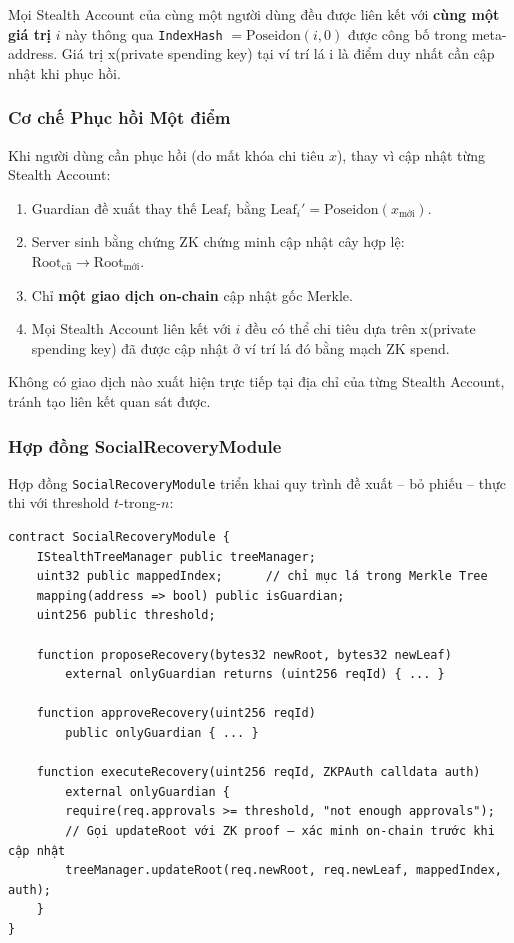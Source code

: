 \documentclass[../DoAn.tex]{subfiles}
\begin{document}
Mọi Stealth Account của cùng một người dùng đều được liên kết với \textbf{cùng một giá trị} $i$ này thông qua \texttt{IndexHash} $= \text{Poseidon}(i, 0)$ được công bố trong meta-address. Giá trị x(private spending key) tại ví trí lá i là điểm duy nhất cần cập nhật khi phục hồi.

\subsubsection{Cơ chế Phục hồi Một điểm}

Khi người dùng cần phục hồi (do mất khóa chi tiêu $x$), thay vì cập nhật từng Stealth Account:

\begin{enumerate}
    \item Guardian đề xuất thay thế $\text{Leaf}_i$ bằng $\text{Leaf}_i' = \text{Poseidon}(x_{\text{mới}})$.
    \item Server sinh bằng chứng ZK chứng minh cập nhật cây hợp lệ: $\text{Root}_{\text{cũ}} \to \text{Root}_{\text{mới}}$.
    \item Chỉ \textbf{một giao dịch on-chain} cập nhật gốc Merkle.
    \item Mọi Stealth Account liên kết với $i$ đều có thể chi tiêu dựa trên x(private spending key) đã được cập nhật ở ví trí lá đó bằng mạch ZK spend.
\end{enumerate}

Không có giao dịch nào xuất hiện trực tiếp tại địa chỉ của từng Stealth Account, tránh tạo liên kết quan sát được.

\subsubsection{Hợp đồng SocialRecoveryModule}

Hợp đồng \texttt{SocialRecoveryModule} triển khai quy trình đề xuất -- bỏ phiếu -- thực thi với threshold $t$-trong-$n$:

\begin{verbatim}
contract SocialRecoveryModule {
    IStealthTreeManager public treeManager;
    uint32 public mappedIndex;      // chỉ mục lá trong Merkle Tree
    mapping(address => bool) public isGuardian;
    uint256 public threshold;

    function proposeRecovery(bytes32 newRoot, bytes32 newLeaf)
        external onlyGuardian returns (uint256 reqId) { ... }

    function approveRecovery(uint256 reqId)
        public onlyGuardian { ... }

    function executeRecovery(uint256 reqId, ZKPAuth calldata auth)
        external onlyGuardian {
        require(req.approvals >= threshold, "not enough approvals");
        // Gọi updateRoot với ZK proof — xác minh on-chain trước khi cập nhật
        treeManager.updateRoot(req.newRoot, req.newLeaf, mappedIndex, auth);
    }
}
\end{verbatim}
\end{document}
